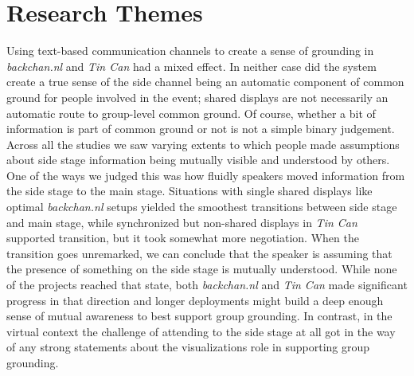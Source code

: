 
\section{Research Themes}

Using text-based communication channels to create a sense of grounding in \emph{backchan.nl} and \emph{Tin Can} had a mixed effect. In neither case did the system create a true sense of the side channel being an automatic component of common ground for people involved in the event; shared displays are not necessarily an automatic route to group-level common ground. Of course, whether a bit of information is part of common ground or not is not a simple binary judgement. Across all the studies we saw varying extents to which people made assumptions about side stage information being mutually visible and understood by others. One of the ways we judged this was how fluidly speakers moved information from the side stage to the main stage.  Situations with single shared displays like optimal \emph{backchan.nl} setups yielded the smoothest transitions between side stage and main stage, while synchronized but non-shared displays in \emph{Tin Can} supported transition, but it took somewhat more negotiation. When the transition goes unremarked, we can conclude that the speaker is assuming that the presence of something on the side stage is mutually understood. While none of the projects reached that state, both \emph{backchan.nl} and \emph{Tin Can} made significant progress in that direction and longer deployments might build a deep enough sense of mutual awareness to best support group grounding. In contrast, in the virtual context the challenge of attending to the side stage at all got in the way of any strong statements about the visualizations role in supporting group grounding.

